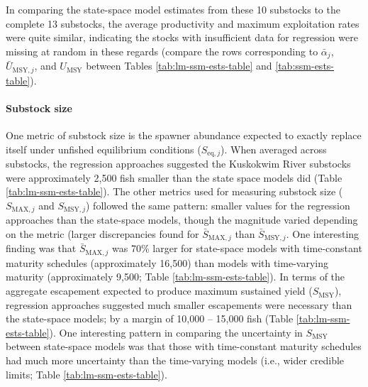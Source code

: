 \documentclass[12pt,]{book}
\let\oldparagraph\paragraph
\renewcommand{\paragraph}[1]{\oldparagraph{#1}\mbox{}}
\theoremstyle{definition}
\theoremstyle{definition}
\theoremstyle{definition}
\theoremstyle{remark}
\begin{document}
In comparing the state-space model estimates from these 10 substocks to
the complete 13 substocks, the average productivity and maximum
exploitation rates were quite similar, indicating the stocks with
insufficient data for regression were missing at random in these regards
(compare the rows corresponding to \(\bar{\alpha}_j\),
\(\bar{U}_{\text{MSY},j}\), and \(U_{\text{MSY}}\) between Tables
\ref{tab:lm-ssm-ests-table} and \ref{tab:ssm-ests-table}).

\paragraph{Substock size}\label{substock-size}

\noindent
One metric of substock size is the spawner abundance expected to exactly
replace itself under unfished equilibrium conditions
(\(S_{\text{eq},j}\)). When averaged across substocks, the regression
approaches suggested the Kuskokwim River substocks were approximately
2,500 fish smaller than the state space models did (Table
\ref{tab:lm-ssm-ests-table}). The other metrics used for measuring
substock size (\(S_{\text{MAX},j}\) and \(S_{\text{MSY},j}\)) followed
the same pattern: smaller values for the regression approaches than the
state-space models, though the magnitude varied depending on the metric
(larger discrepancies found for \(\bar{S}_{\text{MAX},j}\) than
\(\bar{S}_{\text{MSY},j}\). One interesting finding was that
\(\bar{S}_{\text{MAX},j}\) was 70\% larger for state-space models with
time-constant maturity schedules (approximately 16,500) than models with
time-varying maturity (approximately 9,500; Table
\ref{tab:lm-ssm-ests-table}). In terms of the aggregate escapement
expected to produce maximum sustained yield (\(S_{\text{MSY}}\)),
regression approaches suggested much smaller escapements were necessary
than the state-space models; by a margin of 10,000 -- 15,000 fish (Table
\ref{tab:lm-ssm-ests-table}). One interesting pattern in comparing the
uncertainty in \(S_{\text{MSY}}\) between state-space models was that
those with time-constant maturity schedules had much more uncertainty
than the time-varying models (i.e., wider credible limits; Table
\ref{tab:lm-ssm-ests-table}).
\end{document}
